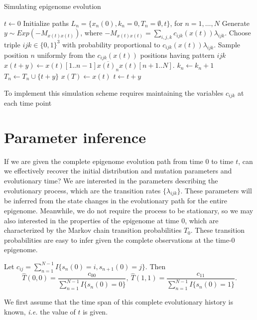 \documentclass[11pt]{article}
\begin{document}
\begin{algorithm}[t]
\begin{algorithmic}[1]
  \caption{Simulating epigenome evolution}
  \STATE $t \leftarrow 0$
  \STATE Initialize paths $L_n = \{x_n(0), k_n=0, T_n=\emptyset, t\}$, for $n=1,\ldots, N$
  \STATE Generate $y\sim \mathit{Exp}(-M_{x(t)x(t)})$, where
  $-M_{x(t)x(t)} = \sum_{i,j,k}c_{ijk}(x(t))\lambda_{ijk}$.
  \STATE Choose triple $ijk \in \{0,1\}^3$ with probability proportional to $c_{ijk}(x(t))\lambda_{ijk}$.
  \STATE Sample position $n$ uniformly from the $c_{ijk}(x(t))$ positions having pattern $ijk$
  \STATE $x(t+y) \leftarrow x(t)[1..n-1]\overline{x(t)_n}x(t)[n+1..N]$.
  \STATE $k_n \leftarrow k_n + 1$ %
  \STATE $T_n \leftarrow T_n\cup \{t+y\}$
  \ELSE
  \STATE $x(T) \leftarrow x(t)$
  \ENDIF
  \STATE $t \leftarrow t+y$
  \ENDWHILE
\end{algorithmic}
\end{algorithm}

To implement this simulation scheme requires maintaining the variables
$c_{ijk}$ at each time point

\section{Parameter inference}

If we are given the complete epigenome evolution path from time $0$ to
time $t$, can we effectively recover the initial distribution and
mutation parameters and evolutionary time? We are interested in the
parameters describing the evolutionary process, which are the
transition rates $\{\lambda_{ijk}\}$. These parameters will be
inferred from the state changes in the evolutionary path for the
entire epigenome. Meanwhile, we do not require the process to be
stationary, so we may also interested in the properties of the
epigenome at time 0, which are characterized by the Markov chain
transition probabilities $T_{0}$. These transition probabilities are
easy to infer given the complete observations at the time-0 epigenome.

Let $c_{ij} = \sum_{n=1}^{N-1}I\{s_n(0) =i, s_{n+1}(0)=j\}$. Then
\[
\hat{T}(0, 0) = \frac{c_{00}}{\sum_{n=1}^{N-1}I\{s_n(0) = 0\}}, ~
\hat{T}(1,1) = \frac{c_{11}}{\sum_{n=1}^{N-1}I\{s_n(0) = 1\}}.
\]

We first assume that the time span of this complete evolutionary
history is known, \textit{i.e.} the value of $t$ is given.
\end{document}
